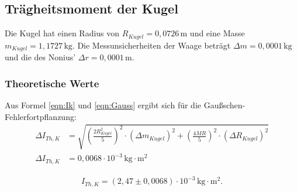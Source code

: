 \subsection{Trägheitsmoment der Kugel}

Die Kugel hat einen Radius von $R_{Kugel} = 0{,}0726\,\mathrm{m} $ und eine Masse $m_{Kugel} = 1{,}1727 \,\mathrm{kg} $.
Die Messunsicherheiten der Waage beträgt $\Delta m = 0,0001\, \mathrm{kg}$ und die des Nonius' $\Delta r = 0,0001\, \mathrm{m}$.

\label{sec:TraegheitsmomentderKugel}

\subsubsection{Theoretische Werte}

Aus Formel \ref{eqn:Ik} und \ref{eqn:Gauss} ergibt sich für die Gaußschen-Fehlerfortpflanzung:
\begin{align}
  \label{eqn:K_Gauss}
  \Delta I_{Th, K} &= \sqrt{\left(\frac{2 R_{Kugel}^2}{5} \right)^2 \cdot (\Delta m_{Kugel})^2 + \left(\frac{4MR}{5} \right)^2 \cdot (\Delta R_{Kugel})^2} \nonumber \\
  \Delta I_{Th, K} &= 0{,}0068 \cdot 10^{-3} \, \mathrm{kg \cdot m^2}
\end{align}

\begin{align*}
  I_{Th, K} = \left(2{,}47 \pm 0{,}0068 \right) \cdot 10^{-3} \, \mathrm{kg}\cdot\mathrm{m^2}.
\end{align*}

